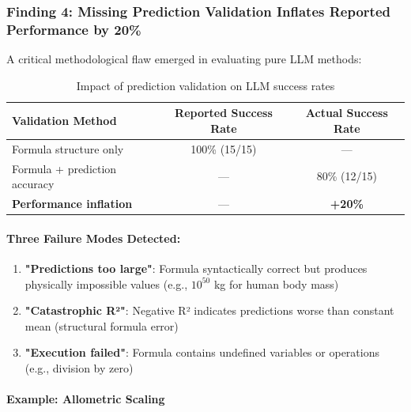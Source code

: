 
\subsubsection{Finding 4: Missing Prediction Validation Inflates Reported Performance by 20\%}

A critical methodological flaw emerged in evaluating pure LLM methods:

\begin{table}[h]
\centering
\begin{tabular}{lcc}
\toprule
\textbf{Validation Method} & \textbf{Reported Success Rate} & \textbf{Actual Success Rate} \\
\midrule
Formula structure only & 100\% (15/15) & --- \\
Formula + prediction accuracy & --- & 80\% (12/15) \\
\midrule
\textbf{Performance inflation} & --- & \textbf{+20\%} \\
\bottomrule
\end{tabular}
\caption{Impact of prediction validation on LLM success rates}
\label{tab:validation_inflation}
\end{table}

\paragraph{Three Failure Modes Detected:}

\begin{enumerate}
    \item \textbf{"Predictions too large"}: Formula syntactically correct but produces physically impossible values (e.g., $10^{50}$ kg for human body mass)

    \item \textbf{"Catastrophic R²"}: Negative R² indicates predictions worse than constant mean (structural formula error)

    \item \textbf{"Execution failed"}: Formula contains undefined variables or operations (e.g., division by zero)
\end{enumerate}

\paragraph{Example: Allometric Scaling}

